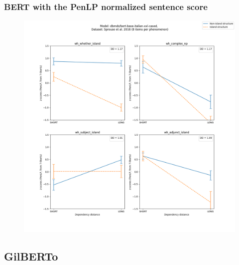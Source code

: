 \subsubsection{BERT with the PenLP normalized sentence score}
\begin{figure}[h]
	\centering
	\includegraphics[width=1\textwidth]{images/AppendixA/Sprouse_wh_dbmdz_bert-base-italian-xxl-cased_PenLP-zscores-likert-2022-09-14_h17m26s15.png} 
	\label{A-fig:sprouse_bert_penlp}
	\caption{}
\end{figure}

\clearpage
\subsection{GilBERTo}

